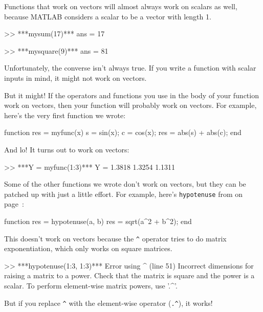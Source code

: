 Functions that work on vectors will almost always work on scalars
as well, because MATLAB considers a scalar to be a vector with
length 1.


\begin{code}
>> ***mysum(17)***
ans = 17

>> ***mysquare(9)***
ans = 81
\end{code}

Unfortunately, the converse isn't always true.  If you write
a function with scalar inputs in mind, it might not work on vectors.

But it might!  If the operators and functions
you use in the body of your function work on vectors, then your
function will probably work on vectors.
For example, here's the very first function we wrote:

\begin{code}
function res = myfunc(x)
    s = sin(x);
    c = cos(x);
    res = abs(s) + abs(c);
end
\end{code}

And lo!  It turns out to work on vectors:

\begin{code}
>> ***Y = myfunc(1:3)***
Y = 1.3818    1.3254    1.1311
\end{code}

Some of the other functions we wrote don't work on vectors,
but they can be patched up with just a little effort.  For example,
here's \lstinline{hypotenuse} from  on page~\pageref{hypotenuse_exercise}:

\begin{code}
function res = hypotenuse(a, b)
    res = sqrt(a^2 + b^2);
end
\end{code}

This doesn't work on vectors because the \lstinline{^} operator
tries to do matrix exponentiation, which only works on
square matrices.


\begin{code}
>> ***hypotenuse(1:3, 1:3)***
Error using  ^  (line 51)
Incorrect dimensions for raising a matrix to a power. 
Check that the matrix is square and the power is a scalar. 
To perform element-wise matrix powers, use '.^'.
\end{code}

But if you replace \lstinline{^} with the element-wise operator
(\lstinline{.^}), it works!

